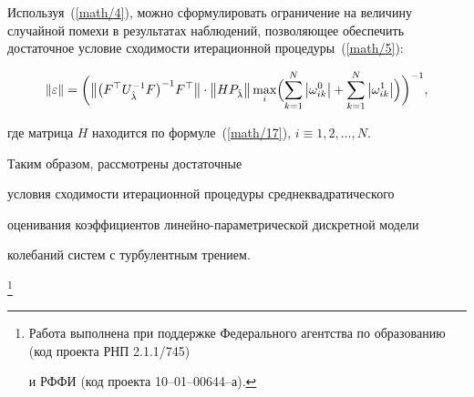 %



%

\smallskip



Используя~(\ref{math/4}),  можно сформулировать ограничение на величину случайной помехи в результатах наблюдений,  позволяющее обеспечить достаточное условие сходимости итерационной процедуры~(\ref{math/5}):

\begin{equation*}


\|\varepsilon\|=

\biggl( \bigl\| \bigl( F^{\top}U^{-1}_{\hat{\lambda}}F \bigr) ^{-1}F^{\top}\bigr\|\cdot \left\|HP_{\hat{\lambda}}\right\|

\max_i \Bigl( \sum_{k=1}^{N}\left|\omega ^{0}_{ik}\right|+\sum_{k=1}^{N}\left|\omega ^{1}_{ik}\right| \Bigr)  \biggl) ^{-1}, 

\end{equation*}

где матрица $H$  находится по формуле~(\ref{math/17}), $i\equiv 1, 2, \ldots, N$.




Таким образом,  рассмотрены достаточные

условия сходимости итерационной процедуры среднеквадратического

оценивания коэффициентов линейно-параметрической дискретной модели

колебаний систем с турбулентным трением.



\thanks{Работа выполнена при  поддержке Федерального агентства по образованию {\rm(}код проекта {\rm РНП 2.1.1/745)} 

и РФФИ {\rm(}код проекта {\rm 10--01--00644--а).}}



